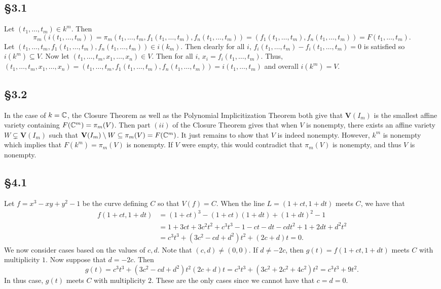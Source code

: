 \documentclass[letterpaper]{article}
\begin{document}
\subsection*{\S 3.1}

Let $(t_{1}, \ldots, t_{m}) \in k^{m}$.
Then
\[
  \pi_{m}(i(t_{1}, \ldots, t_{m})) = \pi_{m}(t_{1}, \ldots, t_{m}, f_{1}(t_{1}, \ldots, t_{m}), f_{n}(t_{1}, \ldots, t_{m})) = (f_{1}(t_{1}, \ldots, t_{m}), f_{n}(t_{1}, \ldots, t_{m})) = F(t_{1}, \ldots, t_{m}).
\]
Let $(t_{1}, \ldots, t_{m}, f_{1}(t_{1}, \ldots, t_{m}), f_{n}(t_{1}, \ldots, t_{m})) \in i(k_{m})$.
Then clearly for all $i$, $f_{i}(t_{1}, \ldots, t_{m}) - f_{i}(t_{1}, \ldots, t_{m}) = 0$ is satisfied so $i(k^{m}) \subseteq V$.
Now let $(t_{1}, \ldots, t_{m}, x_{1}, \ldots, x_{n}) \in V$.
Then for all $i$, $x_{i} = f_{i}(t_{1}, \ldots, t_{m})$.
Thus, $(t_{1}, \ldots, t_{m}, x_{1}, \ldots, x_{n}) = (t_{1}, \ldots, t_{m}, f_{1}(t_{1}, \ldots, t_{m}), f_{n}(t_{1}, \ldots, t_{m})) = i(t_{1}, \ldots, t_{m})$ and overall $i(k^{m}) = V$.

\subsection*{\S 3.2}

In the case of $k = \mathbb{C}$, the Closure Theorem as well as the Polynomial Implicitization Theorem both give that $\mathbf{V}(I_{m})$ is the smallest affine variety containing $F(\mathbb{C}^{m}) = \pi_{m}(V)$.
Then part $(ii)$ of the Closure Theorem gives that when $V$ is nonempty, there exists an affine variety $W \subsetneq \mathbf{V}(I_{m})$ such that $\mathbf{V}(I_{m}) \setminus W \subseteq \pi_{m}(V) = F(\mathbb{C}^{m})$.
It just remains to show that $V$ is indeed nonempty.
However, $k^{m}$ is nonempty which implies that $F(k^{m}) = \pi_{m}(V)$ is nonempty.
If $V$ were empty, this would contradict that $\pi_{m}(V)$ is nonempty, and thus $V$ is nonempty.

\subsection*{\S 4.1}

Let $f = x^{3} - xy + y^{2} - 1$ be the curve defining $C$ so that $V(f) = C$.
When the line $L = (1 + ct, 1 + dt)$ meets $C$, we have that
\begin{align*}
  f(1 + ct, 1 + dt) &= (1 + ct)^{3} - (1 + ct)(1 + dt) + (1 + dt)^{2} - 1 \\
                    &= 1 + 3ct + 3c^{2}t^{2} + c^{3}t^{3} - 1 - ct - dt - cdt^{2} + 1 + 2dt + d^{2}t^{2} \\
                    &= c^{3}t^{3} + (3c^{2} - cd + d^{2})t^{2} + (2c + d)t = 0.
\end{align*}
We now consider cases based on the values of $c, d$.
Note that $(c, d) \neq (0, 0)$.
If $d \neq -2c$, then $g(t) = f(1 + ct, 1 + dt)$ meets $C$ with multiplicity $1$.
Now suppose that $d = -2c$.
Then
\[
  g(t) = c^{3}t^{3} + (3c^{2} - cd + d^{2})t^{2} (2c + d)t = c^{3}t^{3} + (3c^{2} + 2c^{2} + 4c^{2})t^{2} = c^{3}t^{3} + 9t^{2}.
\]
In thus case, $g(t)$ meets $C$ with multiplicity $2$.
These are the only cases since we cannot have that $c = d = 0$.
\end{document}
